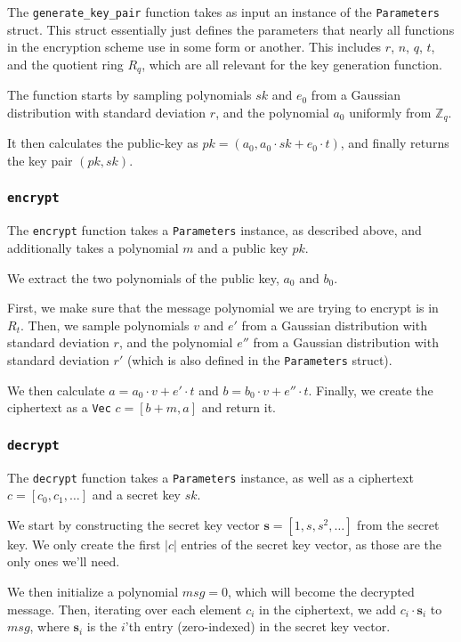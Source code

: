 \documentclass[../main.tex]{subfiles}
\begin{document}
The \lstinline{generate_key_pair} function takes as input an instance of the \lstinline{Parameters} struct.
This struct essentially just defines the parameters that nearly all functions in the encryption scheme use in some form or another.
This includes $r$, $n$, $q$, $t$, and the quotient ring $R_q$, which are all relevant for the key generation function.

The function starts by sampling polynomials $sk$ and $e_0$ from a Gaussian distribution with standard deviation $r$, and the polynomial $a_0$ uniformly from $\mathbb{Z}_q$.

It then calculates the public-key as $pk = (a_0, a_0 \cdot sk + e_0 \cdot t)$, and finally returns the key pair $(pk, sk)$.

\subsubsection{\lstinline{encrypt}}

The \lstinline{encrypt} function takes a \lstinline{Parameters} instance, as described above, and additionally takes a polynomial $m$ and a public key $pk$.

We extract the two polynomials of the public key, $a_0$ and $b_0$.

First, we make sure that the message polynomial we are trying to encrypt is in $R_t$.
Then, we sample polynomials $v$ and $e'$ from a Gaussian distribution with standard deviation $r$, and the polynomial $e''$ from a Gaussian distribution with standard deviation $r'$ (which is also defined in the \lstinline{Parameters} struct).

We then calculate $a = a_0 \cdot v + e' \cdot t$ and $b = b_0 \cdot v + e'' \cdot t$.
Finally, we create the ciphertext as a \lstinline{Vec} $c = [b + m, a]$ and return it.

\subsubsection{\lstinline{decrypt}}

The \lstinline{decrypt} function takes a \lstinline{Parameters} instance, as well as a ciphertext $c = [c_0, c_1, \dots]$ and a secret key $sk$.

We start by constructing the secret key vector $\mathbf{s} = [1, s, s^2, \dots]$ from the secret key.
We only create the first $|c|$ entries of the secret key vector, as those are the only ones we'll need.

We then initialize a polynomial $msg = 0$, which will become the decrypted message.
Then, iterating over each element $c_i$ in the ciphertext, we add $c_i \cdot \mathbf{s}_i$ to $msg$, where $\mathbf{s}_i$ is the $i$'th entry (zero-indexed) in the secret key vector.
\end{document}
